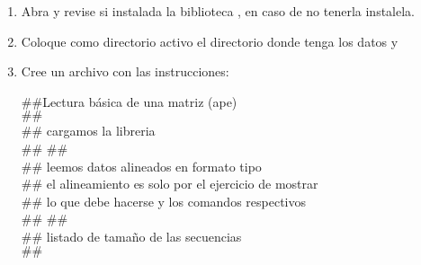\begin{enumerate}
	
	\item Abra  y revise si instalada la biblioteca , en caso de no tenerla instalela.
	
	\item Coloque como directorio activo el directorio donde tenga los datos y 
	
	\item Cree un archivo con las instrucciones:

$\#\#${Lectura b\'asica de una matriz (ape)}\\
$\#\#$
\\$\#\#$ cargamos la libreria 
\\$\#\#$
$\#\#$
\\$\#\#$ leemos datos alineados en formato tipo 
\\$\#\#$ el alineamiento es solo por el ejercicio de mostrar
\\$\#\#$ lo que debe hacerse y los comandos respectivos
\\$\#\#$
$\#\#$
\\$\#\#$ listado de tama\~no de las secuencias
\\$\#\#$


\end{enumerate}
